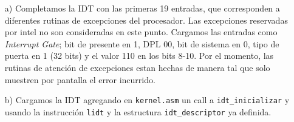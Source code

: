 \begin{enumerate}

\item[a)] Completamos la IDT con las primeras 19 entradas, que corresponden a diferentes rutinas de excepciones del procesador. Las excepciones reservadas por intel no son consideradas en este punto. Cargamos las entradas como {\it Interrupt Gate}; bit de presente en 1, DPL 00, bit de sistema en 0, tipo de puerta en 1 (32 bits) y el valor 110 en los bits 8-10. Por el momento, las rutinas de atención de excepciones estan hechas de manera tal que solo muestren por pantalla el error incurrido.

\item[b)] Cargamos la IDT agregando en {\tt kernel.asm} un call a {\tt idt\_inicializar} y usando la instrucción {\tt lidt} y la estructura {\tt idt\_descriptor} ya definida.  

\end{enumerate}